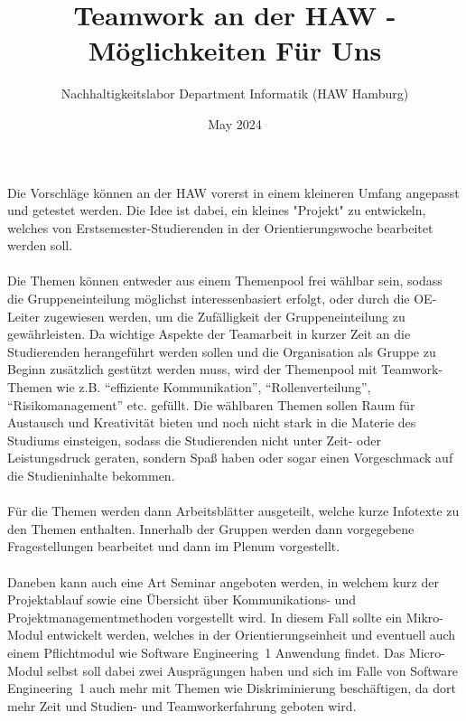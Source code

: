 \documentclass[a4paper]{article}
\title{Teamwork an der HAW - Möglichkeiten Für Uns}
\author{Nachhaltigkeitslabor Department Informatik (HAW Hamburg)}
\date{May 2024}
\begin{document}
\maketitle


Die Vorschläge können an der HAW vorerst in einem kleineren Umfang angepasst und getestet werden. Die Idee ist dabei, ein kleines "Projekt" zu entwickeln, welches von Erstsemester-Studierenden in der Orientierungswoche bearbeitet werden soll.\\\\Die Themen können entweder aus einem Themenpool frei wählbar sein, sodass die Gruppeneinteilung möglichst interessenbasiert erfolgt, oder durch die OE-Leiter zugewiesen werden, um die Zufälligkeit der Gruppeneinteilung zu gewährleisten. Da wichtige Aspekte der Teamarbeit in kurzer Zeit an die Studierenden herangeführt werden sollen und die Organisation als Gruppe zu Beginn zusätzlich gestützt werden muss, wird der Themenpool mit Teamwork-Themen wie z.B. "`effiziente Kommunikation"', "`Rollenverteilung"', "`Risikomanagement"' etc. gefüllt. %
Die wählbaren Themen sollen Raum für Austausch und Kreativität bieten und noch nicht stark in die Materie des Studiums einsteigen, sodass die Studierenden nicht unter Zeit- oder Leistungsdruck geraten, sondern Spaß haben oder sogar einen Vorgeschmack auf die Studieninhalte bekommen.\\\\ Für die Themen werden dann Arbeitsblätter ausgeteilt, welche kurze Infotexte zu den Themen enthalten. Innerhalb der Gruppen werden dann vorgegebene Fragestellungen bearbeitet und dann im Plenum vorgestellt.\\\\ Daneben kann auch eine Art Seminar angeboten werden, in welchem kurz der Projektablauf sowie eine Übersicht über Kommunikations- und Projektmanagementmethoden vorgestellt wird. In diesem Fall sollte ein Mikro-Modul entwickelt werden, welches in der Orientierungseinheit und eventuell auch einem Pflichtmodul wie Software Engineering~1 Anwendung findet. Das Micro-Modul selbst soll dabei zwei Ausprägungen haben und sich im Falle von Software Engineering~1 auch mehr mit Themen wie Diskriminierung beschäftigen, da dort mehr Zeit und Studien- und Teamworkerfahrung geboten wird.\\\\
\end{document}
